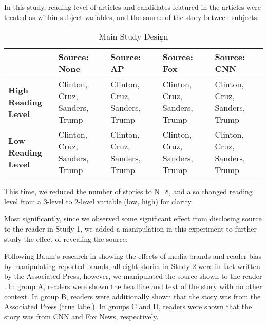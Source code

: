In this study, reading level of articles and candidates featured in the articles were treated as within-subject variables, and the source of the story between-subjects.
\newpage
\begin{center}
\begin{table}
\begin{tabular}{ | m{10em} | m{7em}| m{7em} | m{7em} | m{7em} | } 
 \hline
  & \textbf{Source: None} & \textbf{Source: AP} & \textbf{Source: Fox} & \textbf{Source: CNN} \\
 \hline
 \textbf{High Reading Level} & Clinton, Cruz, Sanders, Trump & Clinton, Cruz, Sanders, Trump & Clinton, Cruz, Sanders, Trump & Clinton, Cruz, Sanders, Trump  \\ 
 \textbf{Low Reading Level} & Clinton, Cruz, Sanders, Trump & Clinton, Cruz, Sanders, Trump & Clinton, Cruz, Sanders, Trump & Clinton, Cruz, Sanders, Trump \\ 
 \hline
\end{tabular}
\caption{Main Study Design}
\label{study2}
\end{table}
\end{center}


This time, we reduced the number of stories to N=8, and also changed reading level from a 3-level to 2-level variable (low, high) for clarity.

Most significantly, since we observed some significant effect from disclosing source to the reader in Study 1, we added a manipulation in this experiment to further study the effect of revealing the source:

Following Baum's research in showing the effects of media brands and reader bias by manipulating reported brands, all eight stories in Study 2 were in fact written by the Associated Press, however, we manipulated the source shown to the reader \cite{baum2008eye}. In group A, readers were shown the headline and text of the story with no other context. In group B, readers were additionally shown that the story was from the Associated Press (true label). In groups C and D, readers were shown that the story was from CNN and Fox News, respectively.

